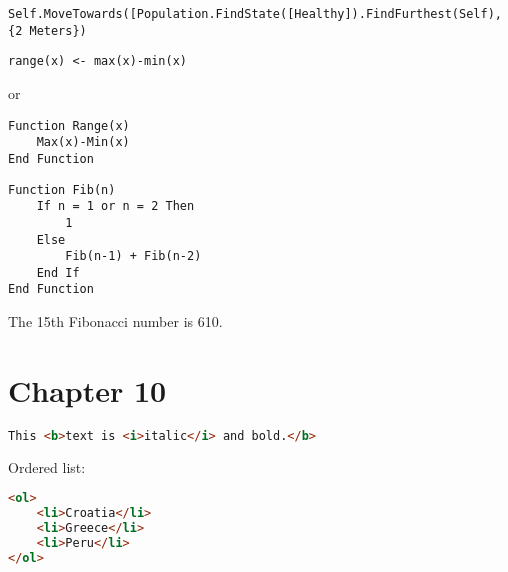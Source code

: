 \documentclass[]{memoir}
\begin{document}
\lstinline!Self.MoveTowards([Population.FindState([Healthy]).FindFurthest(Self), {2 Meters})!


\lstinline!range(x) <- max(x)-min(x)!

or

\begin{lstlisting}
Function Range(x)
    Max(x)-Min(x)
End Function
\end{lstlisting}


\begin{lstlisting}
Function Fib(n)
    If n = 1 or n = 2 Then
        1
    Else
        Fib(n-1) + Fib(n-2)
    End If
End Function
\end{lstlisting}

The 15th Fibonacci number is 610.

\section{Chapter 10}


\begin{lstlisting}[language=HTML]
This <b>text is <i>italic</i> and bold.</b>
\end{lstlisting}


Ordered list:

\begin{lstlisting}[language=HTML]
<ol>
    <li>Croatia</li>
    <li>Greece</li>
    <li>Peru</li>
</ol>
\end{lstlisting}
\end{document}
